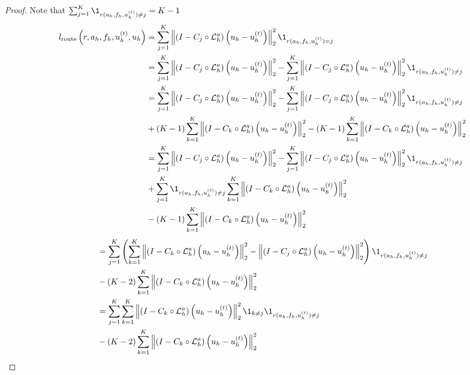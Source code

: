 \documentclass{article}
\begin{document}
\begin{proof}
Note that $\sum_{j = 1}^K \1_{r(a_h, f_h, u^{(t)}_h) \neq j}= K - 1$
\begin{align*}
    l_{\text{route}}\left(r, a_h, f_h, u^{(t)}_h, u_h\right) &= \sum_{j = 1}^K \left\|\left( I - C_{j} \circ \mathcal{L}_{h}^a\right)\left(u_h - u^{(t)}_h\right)\right\|^2_2\1_{r(a_h, f_h, u^{(t)}_h) = j} \\
    &= \sum_{j = 1}^K \left\|\left( I - C_{j} \circ \mathcal{L}_{h}^a\right)\left(u_h - u^{(t)}_h\right)\right\|^2_2 - \sum_{j = 1}^K \left\|\left( I - C_{j} \circ \mathcal{L}_{h}^a\right)\left(u_h - u^{(t)}_h\right)\right\|^2_2\1_{r(a_h, f_h, u^{(t)}_h) \neq j} \\
    &= \sum_{j = 1}^K \left\|\left( I - C_{j} \circ \mathcal{L}_{h}^a\right)\left(u_h - u^{(t)}_h\right)\right\|^2_2 - \sum_{j = 1}^K \left\|\left( I - C_{j} \circ \mathcal{L}_{h}^a\right)\left(u_h - u^{(t)}_h\right)\right\|^2_2\1_{r(a_h, f_h, u^{(t)}_h) \neq j} \\
    &+ \left(K - 1\right)\sum_{k = 1}^K\left\|\left( I - C_{k} \circ \mathcal{L}_{h}^a\right)\left(u_h - u^{(t)}_h\right)\right\|^2_2 - \left(K - 1\right)\sum_{k = 1}^K\left\|\left( I - C_{k} \circ \mathcal{L}_{h}^a\right)\left(u_h - u^{(t)}_h\right)\right\|^2_2 \\
    &= \sum_{j = 1}^K \left\|\left( I - C_{j} \circ \mathcal{L}_{h}^a\right)\left(u_h - u^{(t)}_h\right)\right\|^2_2 - \sum_{j = 1}^K \left\|\left( I - C_{j} \circ \mathcal{L}_{h}^a\right)\left(u_h - u^{(t)}_h\right)\right\|^2_2\1_{r(a_h, f_h, u^{(t)}_h) \neq j} \\
    &+ \sum_{j = 1}^K\1_{r(a_h, f_h, u^{(t)}_h) \neq j}\sum_{k = 1}^K\left\|\left( I - C_{k} \circ \mathcal{L}_{h}^a\right)\left(u_h - u^{(t)}_h\right)\right\|^2_2 \\
    &- \left(K - 1\right)\sum_{k = 1}^K\left\|\left( I - C_{k} \circ \mathcal{L}_{h}^a\right)\left(u_h - u^{(t)}_h\right)\right\|^2_2 \\
\end{align*}
\begin{align*}
    &= \sum_{j = 1}^K\left(\sum_{k = 1}^K\left\|\left( I - C_{k} \circ \mathcal{L}_{h}^a\right)\left(u_h - u^{(t)}_h\right)\right\|^2_2  - \left\|\left( I - C_{j} \circ \mathcal{L}_{h}^a\right)\left(u_h - u^{(t)}_h\right)\right\|^2_2\right)\1_{r(a_h, f_h, u^{(t)}_h) \neq j} \\
    &- \left(K - 2\right)\sum_{k = 1}^K\left\|\left( I - C_{k} \circ \mathcal{L}_{h}^a\right)\left(u_h - u^{(t)}_h\right)\right\|^2_2 \\
    &=\sum_{j = 1}^K\sum_{k = 1}^K\left\|\left( I - C_{k} \circ \mathcal{L}_{h}^a\right)\left(u_h - u^{(t)}_h\right)\right\|^2_2\1_{k\neq j}\1_{r(a_h, f_h, u^{(t)}_h) \neq j} \\
    &- \left(K - 2\right)\sum_{k = 1}^K\left\|\left( I - C_{k} \circ \mathcal{L}_{h}^a\right)\left(u_h - u^{(t)}_h\right)\right\|^2_2
 \end{align*}
\end{proof}
\end{document}
